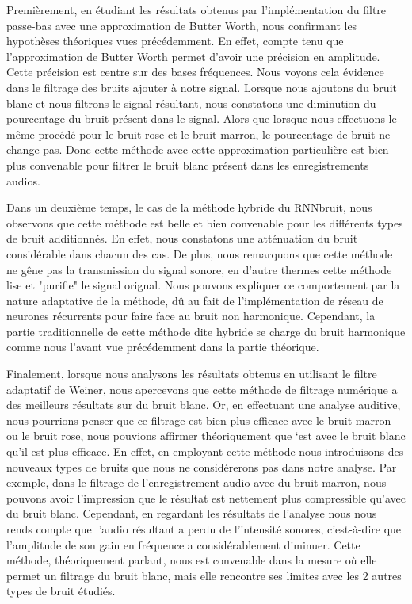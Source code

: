 \documentclass[conference,onecolumn]{IEEEtran}
\begin{document}
Premièrement, en étudiant les résultats obtenus par l'implémentation du filtre passe-bas avec une approximation de Butter Worth, nous confirmant les hypothèses théoriques vues précédemment. En effet, compte tenu que l’approximation de Butter Worth permet d’avoir une précision en amplitude. Cette précision est centre sur des bases fréquences. Nous voyons cela évidence dans le filtrage des bruits ajouter à notre signal. Lorsque nous ajoutons du bruit blanc et nous filtrons le signal résultant, nous constatons une diminution du pourcentage du bruit présent dans le signal. Alors que lorsque nous effectuons le même procédé pour le bruit rose et le bruit marron, le pourcentage de bruit ne change pas. Donc cette méthode avec cette approximation particulière est bien plus convenable pour filtrer le bruit blanc présent dans les enregistrements audios.

Dans un deuxième temps, le cas de la méthode hybride du RNNbruit, nous observons que cette méthode est belle et bien convenable pour les différents types de bruit additionnés. En effet, nous constatons une atténuation du bruit considérable dans chacun des cas. De plus, nous remarquons que cette méthode ne gêne pas la transmission du signal sonore, en d'autre thermes cette méthode lise et "purifie" le signal orignal. Nous pouvons expliquer ce comportement par la nature adaptative de la méthode, dû au fait de l'implémentation de réseau de neurones récurrents pour faire face au bruit non harmonique. Cependant, la partie traditionnelle de cette méthode dite hybride se charge du bruit harmonique comme nous l'avant vue précédemment dans la partie théorique.

Finalement, lorsque nous analysons les résultats obtenus en utilisant le filtre adaptatif de Weiner, nous apercevons que cette méthode de filtrage numérique a des meilleurs résultats sur du bruit blanc. Or, en effectuant une analyse auditive, nous pourrions penser que ce filtrage est bien plus efficace avec le bruit marron ou le bruit rose, nous pouvions affirmer théoriquement que ‘est avec le bruit blanc qu’il est plus efficace. En effet, en employant cette méthode nous introduisons des nouveaux types de bruits que nous ne considérerons pas dans notre analyse. Par exemple, dans le filtrage de l’enregistrement audio avec du bruit marron, nous pouvons avoir l’impression que le résultat est nettement plus compressible qu’avec du bruit blanc. Cependant, en regardant les résultats de l’analyse nous nous rends compte que l’audio résultant a perdu de l’intensité sonores, c’est-à-dire que l’amplitude de son gain en fréquence a considérablement diminuer. Cette méthode, théoriquement parlant, nous est convenable dans la mesure où elle permet un filtrage du bruit blanc, mais elle rencontre ses limites avec les 2 autres types de bruit étudiés.
\end{document}
